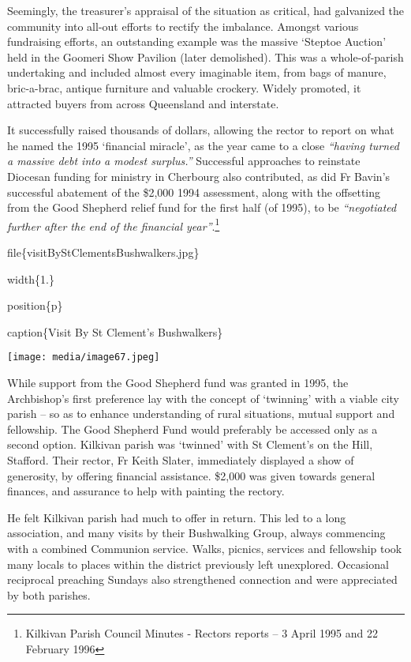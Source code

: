Seemingly, the treasurer's appraisal of the situation as critical, had galvanized the community into all-out efforts to rectify the imbalance. Amongst various fundraising efforts, an outstanding example was the massive `Steptoe Auction' held in the Goomeri Show Pavilion (later demolished). This was a whole-of-parish undertaking and included almost every imaginable item, from bags of manure, bric-a-brac, antique furniture and valuable crockery. Widely promoted, it attracted buyers from across Queensland and interstate.

It successfully raised thousands of dollars, allowing the rector to report on what he named the 1995 `financial miracle', as the year came to a close \emph{``having turned a massive debt into a modest surplus.''} Successful approaches to reinstate Diocesan funding for ministry in Cherbourg also contributed, as did Fr Bavin's successful abatement of the \$2,000 1994 assessment, along with the offsetting from the Good Shepherd relief fund for the first half (of 1995), to be \emph{``negotiated further after the end of the financial year''}.\footnote{Kilkivan Parish Council Minutes - Rectors reports -- 3 April 1995 and 22 February 1996}

file\{visitByStClementsBushwalkers.jpg\}

width\{1.\}

position\{p\}

caption\{Visit By St Clement's Bushwalkers\}

\texttt{[image: media/image67.jpeg]}

While support from the Good Shepherd fund was granted in 1995, the Archbishop's first preference lay with the concept of `twinning' with a viable city parish -- so as to enhance understanding of rural situations, mutual support and fellowship. The Good Shepherd Fund would preferably be accessed only as a second option. Kilkivan parish was `twinned' with St Clement's on the Hill, Stafford. Their rector, Fr Keith Slater, immediately displayed a show of generosity, by offering financial assistance. \$2,000 was given towards general finances, and assurance to help with painting the rectory.

He felt Kilkivan parish had much to offer in return. This led to a long association, and many visits by their Bushwalking Group, always commencing with a combined Communion service. Walks, picnics, services and fellowship took many locals to places within the district previously left unexplored. Occasional reciprocal preaching Sundays also strengthened connection and were appreciated by both parishes.

